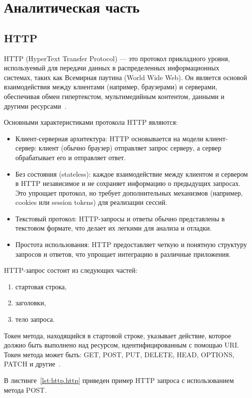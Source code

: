\chapter{Аналитическая часть}
\section{HTTP}
HTTP (HyperText Transfer Protocol) — это протокол прикладного уровня, используемый для передачи данных в распределенных информационных системах, таких как Всемирная паутина (World Wide Web). Он является основой взаимодействия между клиентами (например, браузерами) и серверами, обеспечивая обмен гипертекстом, мультимедийным контентом, данными и другими ресурсами~\cite{rfc9110}.

Основными характеристиками протокола HTTP являются:
\begin{itemize}
    \item Клиент-серверная архитектура: HTTP основывается на модели клиент-сервер: клиент (обычно браузер) отправляет запрос серверу, а сервер обрабатывает его и отправляет ответ.
    \item Без состояния (stateless): каждое взаимодействие между клиентом и сервером в HTTP независимое и не сохраняет информацию о предыдущих запросах. Это упрощает протокол, но требует дополнительных механизмов (например, cookies или session tokens) для реализации сессий. 
    \item Текстовый протокол: HTTP-запросы и ответы обычно представлены в текстовом формате, что делает их легкими для анализа и отладки.
    \item Простота использования: HTTP предоставляет четкую и понятную структуру запросов и ответов, что упрощает интеграцию в различные приложения.
\end{itemize}

HTTP-запрос состоит из следующих частей: 
\begin{enumerate}
    \item стартовая строка,
    \item заголовки,
    \item тело запроса.
\end{enumerate}

Токен метода, находящийся в стартовой строке, указывает действие, которое должно быть выполнено над ресурсом, идентифицированным с помощью URI. Токен метода может быть: GET, POST, PUT, DELETE, HEAD, OPTIONS, PATCH и другие~\cite{rfc2616}.

В листинге~\ref{lst:http.http} приведен пример HTTP запроса с использованием метода POST. 


